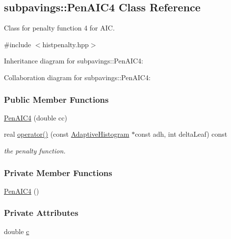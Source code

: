 \hypertarget{classsubpavings_1_1PenAIC4}{\subsection{subpavings\-:\-:\-Pen\-A\-I\-C4 \-Class \-Reference}
\label{classsubpavings_1_1PenAIC4}
}


\-Class for penalty function 4 for \-A\-I\-C.  




{\ttfamily \#include $<$histpenalty.\-hpp$>$}



\-Inheritance diagram for subpavings\-:\-:\-Pen\-A\-I\-C4\-:


\-Collaboration diagram for subpavings\-:\-:\-Pen\-A\-I\-C4\-:
\subsubsection*{\-Public \-Member \-Functions}
\begin{DoxyCompactItemize}
\item 
\hyperlink{classsubpavings_1_1PenAIC4_aacc4f9e77faa5557de031b32c90463fc}{\-Pen\-A\-I\-C4} (double cc)
\item 
real \hyperlink{classsubpavings_1_1PenAIC4_a67df57460a12c319e2cb6e87e0b97c5d}{operator()} (const \hyperlink{classsubpavings_1_1AdaptiveHistogram}{\-Adaptive\-Histogram} $\ast$const adh, int delta\-Leaf) const 
\begin{DoxyCompactList}\small\item\em the penalty function. \end{DoxyCompactList}\end{DoxyCompactItemize}
\subsubsection*{\-Private \-Member \-Functions}
\begin{DoxyCompactItemize}
\item 
\hyperlink{classsubpavings_1_1PenAIC4_aaaab4eeda6d4bf68577fbb9df32cfc17}{\-Pen\-A\-I\-C4} ()
\end{DoxyCompactItemize}
\subsubsection*{\-Private \-Attributes}
\begin{DoxyCompactItemize}
\item 
double \hyperlink{classsubpavings_1_1PenAIC4_a4bc616a39893c9f5bc3c2b3123aa6d1f}{c}
\end{DoxyCompactItemize}



